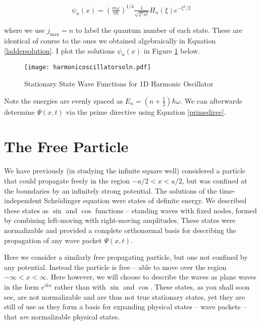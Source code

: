 \begin{align} \label{powerseriessoln}
  \psi_n(x) = \left( \frac{m\omega}{\pi \hbar}\right)^{1/4} \frac{1}{\sqrt{2^n
  n!}} H_n(\xi) e^{-\xi^2 / 2}
\end{align}\vspace{3px}

where we use $j_\text{max} = n$ to label the quantum number of each state.
These are identical of course to the ones we obtained algebraically in
Equation \ref{laddersolution}. I plot the solutions $\psi_n(x)$ in Figure
\ref{graphsoln} below. 

\begin{figure}[!ht]
  \centering
    \texttt{[image: harmonicoscillatorsoln.pdf]}
    \caption{Stationary State Wave Functions for 1D Harmonic Oscillator}
    \label{graphsoln}
\end{figure}

Note the energies are evenly spaced as $E_n = \left( n + \frac{1}{2} \right)
\hbar\omega $. We can afterwards determine $\Psi(x, t)$ via the prime
directive using Equation \ref{primedirec}. 

\section{The Free Particle}

We have previously (in studying the infinite square well) considered a particle
that could propagate freely in the region $-a/2 < x < a/2$, but was confined at
the boundaries by an infinitely strong potential. The solutions of the
time-independent Schr\"odinger equation were states of definite energy. We
described these states as $\sin$ and $\cos$ functions -- standing waves with
fixed nodes, formed by combining left-moving with right-moving amplitudes.
These states were normalizable and provided a complete orthonormal basis for
describing the propagation of any wave packet $\Psi(x, t)$. 

Here we consider a similarly free propagating particle, but one not confined by
any potential. Instead the particle is free -- able to move over the region
$-\infty < x < \infty$. Here however, we will choose to describe the waves as
plane waves in the form $e^{ikx}$ rather than with $\sin$ and $\cos$. These
states, as you shall soon see, are not normalizable and are thus not true
stationary states, yet they are still of use as they form a basis for expanding
physical states -- wave packets -- that \textit{are} normalizable physical
states. 

